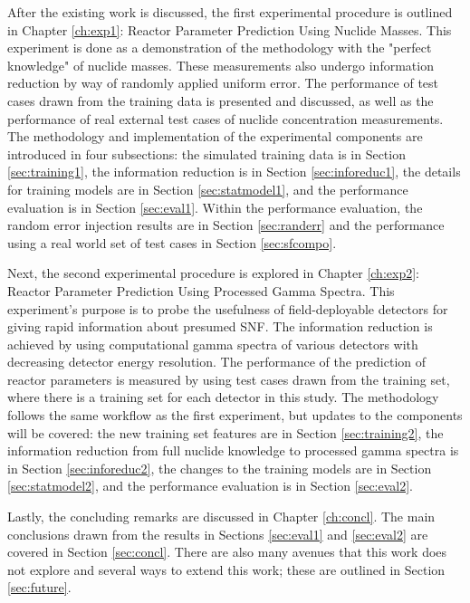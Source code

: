 After the existing work is discussed, the first experimental procedure is
outlined in Chapter \ref{ch:exp1}: Reactor Parameter Prediction Using Nuclide
Masses.  This experiment is done as a demonstration of the methodology with the
"perfect knowledge" of nuclide masses. These measurements also undergo
information reduction by way of randomly applied uniform error. The performance
of test cases drawn from the training data is presented and discussed, as well
as the performance of real external test cases of nuclide concentration
measurements.  The methodology and implementation of the experimental
components are introduced in four subsections: the simulated training data is
in Section \ref{sec:training1}, the information reduction is in Section
\ref{sec:inforeduc1}, the details for training models are in Section
\ref{sec:statmodel1}, and the performance evaluation is in Section
\ref{sec:eval1}. Within the performance evaluation, the random error injection
results are in Section \ref{sec:randerr} and the performance using a real world
set of test cases in Section \ref{sec:sfcompo}.

Next, the second experimental procedure is explored in Chapter \ref{ch:exp2}:
Reactor Parameter Prediction Using Processed Gamma Spectra.  This experiment's
purpose is to probe the usefulness of field-deployable detectors for giving
rapid information about presumed \gls{SNF}. The information reduction is
achieved by using computational gamma spectra of various detectors with
decreasing detector energy resolution.  The performance of the prediction of
reactor parameters is measured by using test cases drawn from the training set,
where there is a training set for each detector in this study.  The methodology
follows the same workflow as the first experiment, but updates to the
components will be covered: the new training set features are in Section
\ref{sec:training2}, the information reduction from full nuclide knowledge to
processed gamma spectra is in Section \ref{sec:inforeduc2}, the changes to the
training models are in Section \ref{sec:statmodel2}, and the performance
evaluation is in Section \ref{sec:eval2}.

Lastly, the concluding remarks are discussed in Chapter \ref{ch:concl}. The
main conclusions drawn from the results in Sections \ref{sec:eval1} and
\ref{sec:eval2} are covered in Section \ref{sec:concl}. There are also many
avenues that this work does not explore and several ways to extend this work;
these are outlined in Section \ref{sec:future}.
